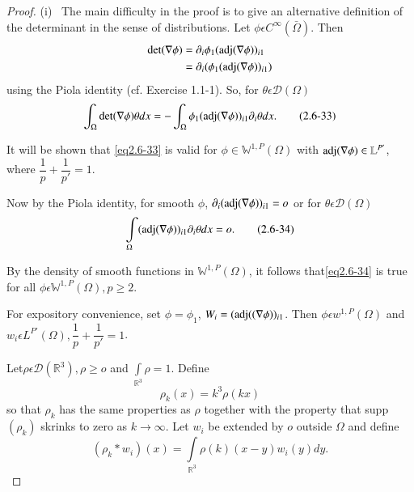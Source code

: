 \begin{proof}
(i)~ The main difficulty in the proof is to give an alternative
  definition of the determinant in the sense of distributions. 
Let $\phi \epsilon C^\infty (\bar{\Omega})$. Then
\begin{align*}
\det (\nabla \phi) &= \partial_i \phi_1 (\operatorname{adj} (\nabla
\phi))_{i1}\\ 
&= \partial_i (\phi_1 (\operatorname{adj} (\nabla \phi))_{i1})
\end{align*}
using the Piola identity (cf. Exercise 1.1-1). So, for $\theta
\epsilon \mathcal{D}(\Omega)$ 
\begin{equation*}
\int_\Omega \det (\nabla \phi)\theta dx = - \int_\Omega
\phi_1(\operatorname{adj} (\nabla \phi))_{i1}\partial_i \theta
dx.\tag{2.6-33} \label{eq2.6-33}
\end{equation*}

It will be shown that \eqref{eq2.6-33} is valid for $\phi \in
\mathbb{W}^{1,P}(\Omega)$ with $\adj (\nabla \phi)\break \in
\mathbb{L}^{P'}$, where $\dfrac{1}{p}+\dfrac{1}{p'}=1$. 

Now by the Piola identity, for smooth $\phi$, $\partial_i (\operatorname{adj}
(\nabla \phi))_{i1}=o$ or for $\theta \epsilon
\mathcal{D}(\Omega)$ 
\begin{equation*}
\int\limits_\Omega(\operatorname{adj}(\nabla \phi))_{i1} \partial_i \theta dx
=o. \tag{2.6-34} \label{eq2.6-34}
\end{equation*}

By the density of smooth functions in $\mathbb{W}^{1,P}(\Omega)$, it
follows that\break \eqref{eq2.6-34} is true for all $\phi \epsilon
\mathbb{W}^{1,P}(\Omega), p \ge 2$. 

For expository convenience, set $\phi = \phi_1$, $W_i=(\operatorname{adj}
((\nabla \phi))_{i1}$. 
Then $\phi \epsilon w^{1,P}(\Omega)$ and $w_i \epsilon
L^{P'}(\Omega), \dfrac{1}{p}+\dfrac{1}{p'}=1$. 

Let\pageoriginale $\rho \epsilon \mathcal{D}(\mathbb{R}^3), \rho \ge o$ and
$\int\limits_{\mathbb{R}^3} \rho =1$. Define 
\begin{equation*}
  \rho_k(x)=k^3 \rho(kx) \tag{2.6-35}\label{eq2.6-35}
\end{equation*}
so that $\rho_k$ has the same properties as $\rho$ together with the
property that supp $(\rho_k)$ skrinks to zero as $k \to \infty$. Let
$w_i$ be extended by $o$ outside $\Omega$ and define 
\begin{equation*}
(\rho_k*
w_i)(x)=\int\limits_{\mathbb{R}^3}\rho(k)(x-y)w_i(y)dy. \tag{2.6-36}\label{eq2.6-36} 
\end{equation*}


\end{proof}
